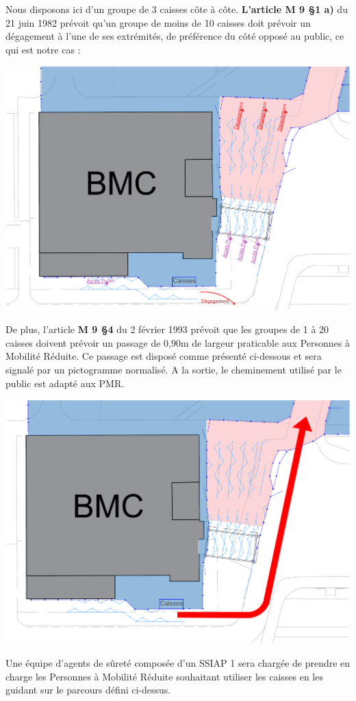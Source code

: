 \documentclass[hidelinks, paper=a4, fontsize=13pt]{report}
\begin{document}
Nous disposons ici d’un groupe de 3 caisses côte à côte. \textbf{L’article M 9 §1 a)} du 21 juin 1982 prévoit qu’un groupe de moins de 10 caisses doit prévoir un dégagement à l’une de ses extrémités, de préférence du côté opposé au public, ce qui est notre cas :
\begin{center}
	\includegraphics[width=.8\textwidth,keepaspectratio]{Exports/Plan_24h_44eme-Entree_Degagements}
\end{center}
De plus, l’article \textbf{M 9 §4 }du 2 février 1993 prévoit que les groupes de 1 à 20 caisses doivent prévoir un passage de 0,90m de largeur praticable aux Personnes à Mobilité Réduite. Ce passage est disposé comme présenté ci-dessous et sera signalé par un pictogramme normalisé. A la sortie, le cheminement utilisé par le public est adapté aux PMR. 

\begin{center}
	\includegraphics[width=.6\textwidth,keepaspectratio]{Exports/Plan_24h_44eme-Entree_PMR}
\end{center}


Une équipe d’agents de sûreté composée d’un SSIAP 1 sera chargée de prendre en charge les Personnes à Mobilité Réduite souhaitant utiliser les caisses en les guidant sur le parcours défini ci-dessus. 
\newpage
\end{document}

